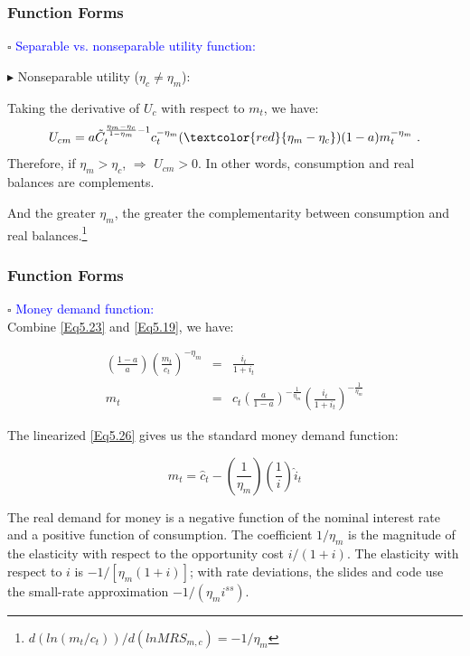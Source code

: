 \documentclass[handout]{beamer}
\begin{document}
\begin{frame}
\frametitle{Function Forms}\vskip 0.1in

$\square$ \textcolor{blue}{Separable vs. nonseparable utility
function:}\vskip 0.1in

$\blacktriangleright$ Nonseparable utility ($\eta_{c}\neq
\eta_{m}$):\vskip 0.1in

Taking the derivative of $U_{c}$ with respect to $m_{t}$, we have:
\begin{equation}\label{Eq5.24}
U_{cm} = a \tilde{C}_{t}^{\frac{\eta_{m}-\eta_{c}}{1-\eta_{m}}-1}
c_{t}^{-\eta_{m}} (\textcolor{red}{\eta_{m}-\eta_{c}})(1-a)
m_{t}^{-\eta_{m}} ~.
\end{equation}
Therefore, if $\eta_{m} > \eta_{c}$, $\Rightarrow$ $U_{cm}> 0$. In
other words, consumption and real balances are complements.\vskip
0.05in

And the greater $\eta_{m}$, the greater the complementarity between consumption and
real balances.\footnote{${d(ln(m_{t}/c_{t}))}/{d(
lnMRS_{m,c})}=-{1}/{\eta_{m}}$}
\end{frame}

\begin{frame}
\small

\frametitle{Function Forms}\vskip 0.1in

$\square$ \textcolor{blue}{Money demand function:}\\


Combine \eqref{Eq5.23} and \eqref{Eq5.19}, we have:

\begin{eqnarray}
(\frac{1-a}{a}) (\frac{m_{t}}{c_{t}})^{-\eta_{m}}&=&
\frac{i_{t}}{1+i_{t}}
\label{Eq5.25}\\
m_{t} &=& c_{t}(\frac{a}{1-a})^{-\frac{1}{\eta_{m}}}
(\frac{i_{t}}{1+i_{t}})^{-\frac{1}{\eta_{m}}}\label{Eq5.26}
\end{eqnarray}



The linearized \eqref{Eq5.26} gives us the standard money demand
function:

\begin{equation}\label{Eq5.27}
\hat{m}_{t} = \hat{c}_{t}
-(\frac{1}{\eta_{m}})(\frac{1}{i})\hat{i}_{t}
\end{equation}

The real demand for money is a negative function of the nominal
interest rate and a positive function of consumption. The
coefficient $1/\eta_m$ is the magnitude of the elasticity with respect to the opportunity cost $i/(1+i)$. The elasticity with respect to $i$ is $-1/[\eta_m(1+i)]$; with rate deviations, the slides and code use the small-rate approximation $-1/(\eta_m i^{ss})$.

\end{frame}
\end{document}
